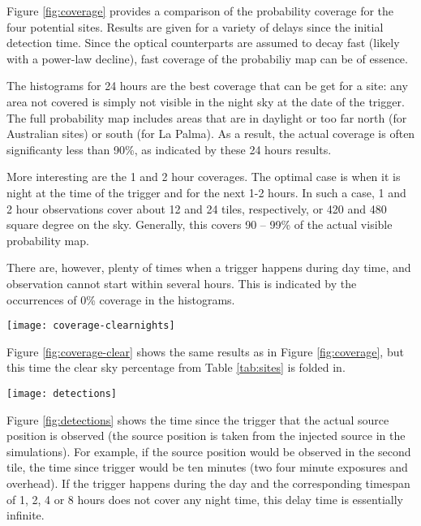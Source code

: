\documentclass[twocolumn]{article}
\begin{document}
Figure \ref{fig:coverage} provides a comparison of the probability
coverage for the four potential sites. Results are given for a variety
of delays since the initial detection time. Since the optical
counterparts are assumed to decay fast (likely with a power-law
decline), fast coverage of the probabiliy map can be of essence.

The histograms for 24 hours are the best coverage that can be get for a site: any area not covered is simply not visible in the night sky at the date of the trigger. The full probability map includes areas that are in daylight or too far north (for Australian sites) or south (for La Palma). As a result, the actual coverage is often significanty less than 90\%, as indicated by these 24 hours results. 

More interesting are the 1 and 2 hour coverages. The optimal case is when it is night at the time of the trigger and for the next 1-2 hours. In such a case, 1 and 2 hour observations cover about 12 and 24 tiles, respectively, or 420 and 480 square degree on the sky. Generally, this covers 90 -- 99\% of the actual visible probability map.

There are, however, plenty of times when a trigger happens during day
time, and observation cannot start within several hours. This is
indicated by the occurrences of 0\% coverage in the histograms.

\begin{figure*}
  \texttt{[image: coverage-clearnights]}
  \caption{Same as Figure \ref{fig:coverage}, but with the clear sky coverage folded in for each site.}
  \label{fig:coverage-clear}
\end{figure*}


Figure \ref{fig:coverage-clear} shows the same results as in Figure \ref{fig:coverage}, but this time the clear sky percentage from Table \ref{tab:sites} is folded in.


\begin{figure*}
  \texttt{[image: detections]}
  \caption{Histograms of the times since trigger that the actual source position is observed. This uses an observing strategy that observes tiles in decreasing order of probability skymap coverage.}
  \label{fig:detections}
\end{figure*}

Figure \ref{fig:detections} shows the time since the trigger that the actual source position is observed (the source position is taken from the injected source in the simulations). For example, if the source position would be observed in the second tile, the time since trigger would be ten minutes (two four minute exposures and overhead). If the trigger happens during the day and the corresponding timespan of 1, 2, 4 or 8 hours does not cover any night time, this delay time is essentially infinite.
\end{document}
